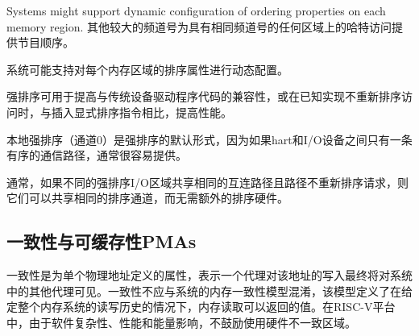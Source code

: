 {Systems might support dynamic configuration of ordering properties on
each memory region.
\fi
其他较大的频道号为具有相同频道号的任何区域上的哈特访问提供节目顺序。

系统可能支持对每个内存区域的排序属性进行动态配置。

\iffalse
\begin{commentary}
Strong ordering can be used to improve compatibility with legacy
device driver code, or to enable increased performance compared to
insertion of explicit ordering instructions when the implementation is
known to not reorder accesses.

Local strong ordering (channel 0) is the default form of strong
ordering as it is often straightforward to provide if there is only a
single in-order communication path between the hart and the I/O
device.

Generally, different strongly ordered I/O regions can share the same
ordering channel without additional ordering hardware if they share
the same interconnect path and the path does not reorder requests.
\end{commentary}
\fi
\begin{commentary}
强排序可用于提高与传统设备驱动程序代码的兼容性，或在已知实现不重新排序访问时，与插入显式排序指令相比，提高性能。

本地强排序（通道0）是强排序的默认形式，因为如果hart和I/O设备之间只有一条有序的通信路径，通常很容易提供。

通常，如果不同的强排序I/O区域共享相同的互连路径且路径不重新排序请求，则它们可以共享相同的排序通道，而无需额外的排序硬件。
\end{commentary}

\subsection{一致性与可缓存性PMAs}

\iffalse
Coherence is a property defined for a single physical address, and
indicates that writes to that address by one agent will eventually be
made visible to other agents in the system.  Coherence is not to be
confused with the memory consistency model of a system, which defines
what values a memory read can return given the previous history of
reads and writes to the entire memory system.  In RISC-V platforms,
the use of hardware-incoherent regions is discouraged due to software
complexity, performance, and energy impacts.
\fi
一致性是为单个物理地址定义的属性，表示一个代理对该地址的写入最终将对系统中的其他代理可见。一致性不应与系统的内存一致性模型混淆，该模型定义了在给定整个内存系统的读写历史的情况下，内存读取可以返回的值。在RISC-V平台中，由于软件复杂性、性能和能量影响，不鼓励使用硬件不一致区域。

}
